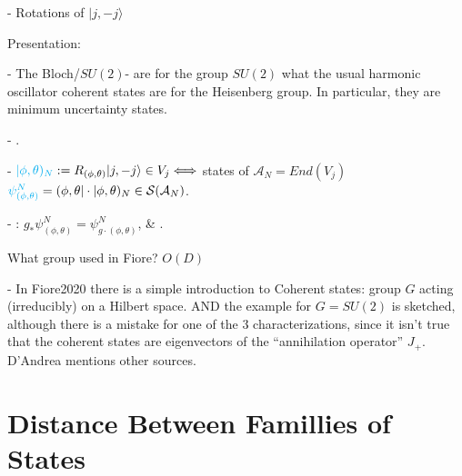 {\color{gray} 
 - Rotations of $|j, -j \rangle$
 
Presentation:

- The Bloch/$SU(2)$- are for the group $SU(2)$ what the usual harmonic oscillator coherent states are for the Heisenberg group. In particular, they are minimum uncertainty states. 

- .

-  $\lbtext{|\phi, \theta)_N} := R_{(\phi, \theta)}|j, -j\rangle \in V_j \Longleftrightarrow $ states of $\mathcal A_N = End(V_j)$ $\lbtext{\psi^N_{(\phi, \theta)}} = (\phi, \theta| \cdot |\phi, \theta)_N \in \mathcal S(\mathcal A_N)$. 

- : $g_* \psi^N_{(\phi, \theta)} = \psi^N_{g\cdot (\phi, \theta)}$, \& .

What group used in Fiore? $O(D)$

- In Fiore2020 there is a simple introduction to Coherent states: group $G$ acting (irreducibly) on a Hilbert space. AND the example for $G = SU(2)$ is sketched, although there is a mistake for one of the $3$ characterizations, since it isn't true that the coherent states are eigenvectors of the ``annihilation operator'' $J_+$. D'Andrea mentions other sources.
}

\linea

\section{Distance Between Famillies of  States}





